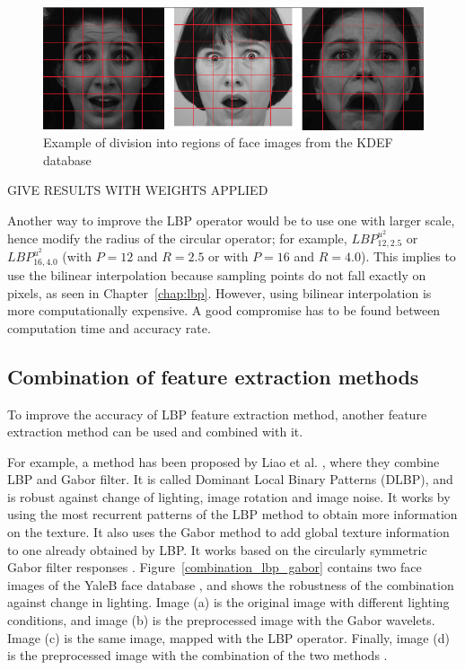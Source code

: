 \begin{figure}[!h]
\begin{center}
\noindent \includegraphics[scale=0.3]{figures/implementation_weight_example} 
\newline
\caption{Example of division into regions of face images from the KDEF database}
\label{implementation_weight_example}
\end{center} 
\end{figure}

\noindent GIVE RESULTS WITH WEIGHTS APPLIED
\newline

\noindent Another way to improve the LBP operator would be to use one with larger scale, hence modify the radius of the circular operator; for example, $ LBP_{12,2.5}^{u^2} $ or $ LBP_{16,4.0}^{u^2} $ (with $ P = 12 $ and $ R = 2.5 $ or with $ P = 16 $ and $ R = 4.0 $). This implies to use the bilinear interpolation because sampling points do not fall exactly on pixels, as seen in Chapter~\ref{chap:lbp}. However, using bilinear interpolation is more computationally expensive. A good compromise has to be found between computation time and accuracy rate.
\newline

\subsection{Combination of feature extraction methods}

\vspace{\baselineskip}
\noindent To improve the accuracy of LBP feature extraction method, another feature extraction method can be used and combined with it. 
\newline

\noindent  For example, a method has been proposed by Liao et al. \cite{LIA09}, where they combine LBP and Gabor filter. It is called Dominant Local Binary Patterns (DLBP), and is robust against change of lighting, image rotation and image noise.  It works by using the most recurrent patterns of the LBP method to obtain more information on the texture. It also uses the Gabor method to add global texture information to one already obtained by LBP. It works based on the circularly symmetric Gabor filter responses \cite{LIA09}. Figure~\ref{combination_lbp_gabor} contains two face images of the YaleB face database , and shows the robustness of the combination against change in lighting. Image (a) is the original image with different lighting conditions, and image (b) is the preprocessed image with the Gabor wavelets. Image (c) is the same image, mapped with the LBP operator. Finally, image (d) is the preprocessed image with the combination of the two methods \cite{GOH11}.
\newline

